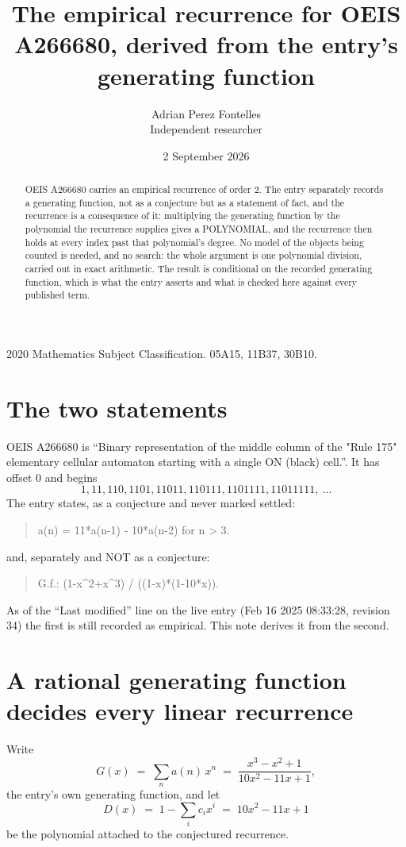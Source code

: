 \documentclass[11pt,a4paper]{article}
\title{The empirical recurrence for OEIS A266680, derived from the entry's generating function}
\author{Adrian Perez Fontelles\\ \small Independent researcher}
\date{2 September 2026}
\theoremstyle{plain}
\theoremstyle{definition}
\begin{document}
\maketitle

\begin{abstract}
OEIS A266680 carries an empirical recurrence of order $2$. The entry separately records a
generating function, not as a conjecture but as a statement of fact, and the recurrence is a
consequence of it: multiplying the generating function by the polynomial the recurrence
supplies gives a POLYNOMIAL, and the recurrence then holds at every index past that
polynomial's degree. No model of the objects being counted is needed, and no search: the
whole argument is one polynomial division, carried out in exact arithmetic. The result is
conditional on the recorded generating function, which is what the entry asserts and what is
checked here against every published term.
\end{abstract}

\noindent\small 2020 Mathematics Subject Classification. 05A15, 11B37, 30B10.\normalsize

\section{The two statements}

OEIS A266680 is ``Binary representation of the middle column of the "Rule 175" elementary cellular automaton starting with a single ON (black) cell.''. It has offset $0$ and begins
\[
1, 11, 110, 1101, 11011, 110111, 1101111, 11011111,\ \dots
\]
The entry states, as a conjecture and never marked settled:
\begin{quote}
a(n) = 11*a(n-1) - 10*a(n-2) for n > 3.
\end{quote}
and, separately and NOT as a conjecture:
\begin{quote}
G.f.: (1-x\^{}2+x\^{}3) / ((1-x)*(1-10*x)).
\end{quote}
As of the ``Last modified'' line on the live entry (Feb 16 2025 08:33:28, revision 34) the first is still
recorded as empirical. This note derives it from the second.

\section{A rational generating function decides every linear recurrence}

Write
\[
G(x)\;=\;\sum_{n}a(n)\,x^{n}\;=\;\frac{x^{3} - x^{2} + 1}{10 x^{2} - 11 x + 1},
\]
the entry's own generating function, and let
\[
D(x)\;=\;1-\sum_i c_i x^{i}\;=\;10 x^{2} - 11 x + 1
\]
be the polynomial attached to the conjectured recurrence.
\end{document}
